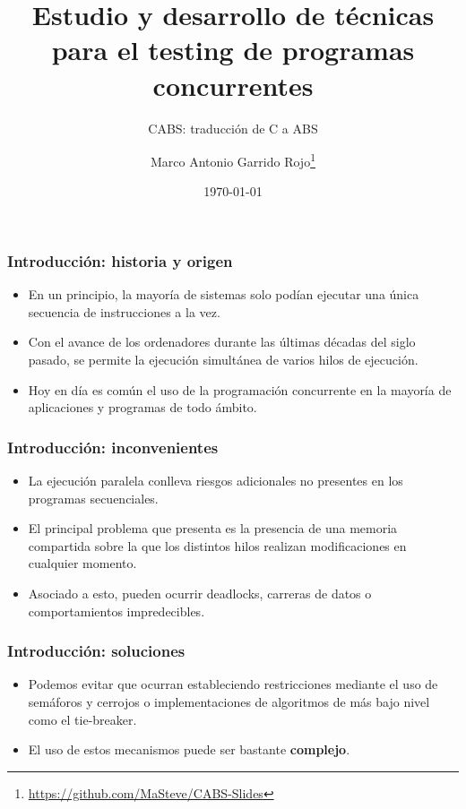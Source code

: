 \documentclass[spanish, a4paper, 12pt, final, slideColor, nototal, colorBG, pdf, noaccumulate, darkblue] {beamer}
\title{Estudio y desarrollo de técnicas para el testing de programas concurrentes}
\subtitle{CABS: traducción de C a ABS}
\author{Marco Antonio Garrido Rojo\thanks{\url{https://github.com/MaSteve/CABS-Slides}}}
\date{\today}
\begin{document}
\maketitle
\begin{frame}
  \frametitle{Introducción: historia y origen}
  \begin{itemize}
  \item En un principio, la mayoría de sistemas solo podían ejecutar una única secuencia de instrucciones a la vez.
  \item Con el avance de los ordenadores durante las últimas décadas del siglo pasado, se permite la ejecución simultánea de varios hilos de ejecución.
  \item Hoy en día es común el uso de la programación concurrente en la mayoría de aplicaciones y programas de todo ámbito.
  \end{itemize}
\end{frame}

\begin{frame}
  \frametitle{Introducción: inconvenientes}
  \begin{itemize}
  \item La ejecución paralela conlleva riesgos adicionales no presentes en los programas secuenciales.
  \item El principal problema que presenta es la presencia de una memoria compartida sobre la que los distintos hilos realizan modificaciones en cualquier momento.
  \item Asociado a esto, pueden ocurrir deadlocks, carreras de datos o comportamientos impredecibles.
  \end{itemize}
\end{frame}

\begin{frame}
  \frametitle{Introducción: soluciones}
  \begin{itemize}
  \item Podemos evitar que ocurran estableciendo restricciones mediante el uso de semáforos y cerrojos o implementaciones de algoritmos de más bajo nivel como el tie-breaker.
  \item El uso de estos mecanismos puede ser bastante \textbf{complejo}.
  \end{itemize}
\end{frame}
\end{document}

